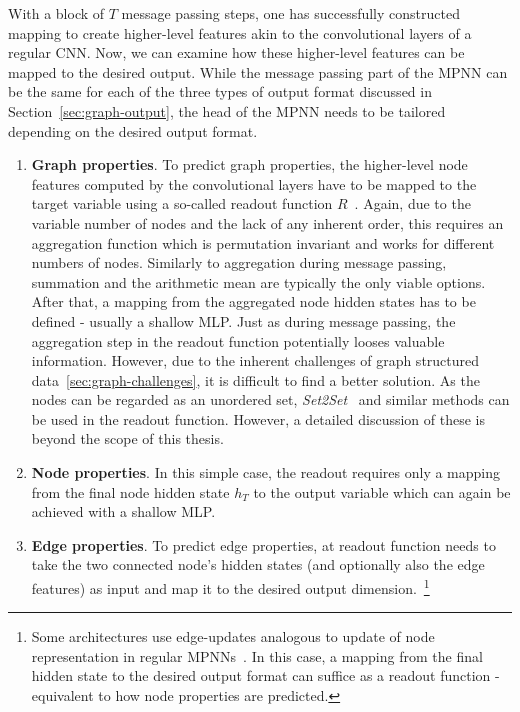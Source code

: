 With a block of $T$ message passing steps, one has successfully constructed mapping to create higher-level features akin to the convolutional layers of a regular CNN. Now, we can examine how these higher-level features can be mapped to the desired output. While the message passing part of the MPNN can be the same for each of the three types of output format discussed in Section~\ref{sec:graph-output}, the head of the MPNN needs to be tailored depending on the desired output format.

\begin{enumerate}
	\item \textbf{Graph properties}. To predict graph properties, the higher-level node features computed by the convolutional layers have to be mapped to the target variable using a so-called readout function $R$~\cite{Gilmer2017}. Again, due to the variable number of nodes and the lack of any inherent order, this requires an aggregation function which is permutation invariant and works for different numbers of nodes. Similarly to aggregation during message passing, summation and the arithmetic mean are typically the only viable options. After that, a mapping from the aggregated node hidden states has to be defined - usually a shallow MLP.
	Just as during message passing, the aggregation step in the readout function potentially looses valuable information. However, due to the inherent challenges of graph structured data~\ref{sec:graph-challenges}, it is difficult to find a better solution. As the nodes can be regarded as an unordered set, \textit{Set2Set}~\cite{Vinyals2015} and similar methods can be used in the readout function. However, a detailed discussion of these is beyond the scope of this thesis.
	\item \textbf{Node properties}. In this simple case, the readout requires only a mapping from the final node hidden state $h_T$ to the output variable which can again be achieved with a shallow MLP.
	\item \textbf{Edge properties}. To predict edge properties, at readout function needs to take the two connected node's hidden states (and optionally also the edge features) as input and map it to the desired output dimension.~\footnote{Some architectures use edge-updates analogous to update of node representation in regular MPNNs~\cite{Jørgensen2018}. In this case, a mapping from the final hidden state to the desired output format can suffice as a readout function - equivalent to how node properties are predicted.}
\end{enumerate}


